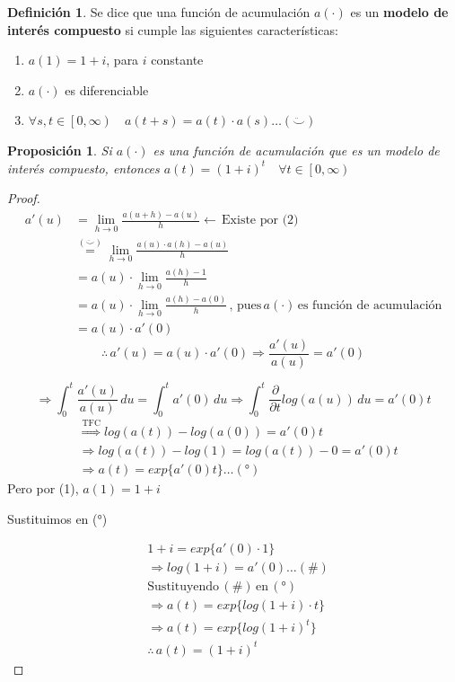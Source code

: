 \documentclass[
]{book}
\newtheorem{proposition}{Proposición}[chapter]
\theoremstyle{definition}
\newtheorem{definition}{Definición}[chapter]
\theoremstyle{definition}
\theoremstyle{definition}
\theoremstyle{definition}
\theoremstyle{remark}
\begin{document}
\begin{definition}

Se dice que una función de acumulación \(a(\cdot)\) es un \textbf{{modelo de interés compuesto}} si cumple las siguientes características:

\begin{enumerate}
\def\labelenumi{(\arabic{enumi})}
\item
  \(a(1) = 1+i\), para \(i\) constante
\item
  \(a(\cdot)\) es diferenciable
\item
  \(\forall s,t \in \left[0,\infty \right) \quad a(t+s)= a(t)\cdot a(s) \ldots (\ddot\smile)\)
\end{enumerate}

\end{definition}

\begin{proposition}
Si \(a(\cdot)\) es una función de acumulación que es un modelo de interés compuesto, entonces \(a(t) = (1+i)^t \quad \forall t\in \left[0,\infty \right)\)
\end{proposition}

\begin{proof}
\begin{align*}
a'(u) &= \lim\limits_{h \to 0} \frac{a(u+h)-a(u)}{h} \longleftarrow \, \text{Existe por (2)} \\
&\stackrel{(\ddot\smile)}{=} \lim\limits_{h \to 0} \frac{a(u)\cdot a(h) - a(u)}{h}\\
&=  a(u) \cdot \lim\limits_{h \to 0} \frac{a(h)-1}{h}\\
&=  a(u) \cdot \lim\limits_{h \to 0} \frac{a(h)-a(0)}{h}\, \text{, pues} \, a(\cdot) \, \text{es función de acumulación}\\
&= a(u)\cdot a'(0)
\end{align*}
\[\therefore \, a'(u) = a(u) \cdot a'(0) \Longrightarrow \frac{a'(u)}{a(u)} = a'(0)\]

\[\Longrightarrow \int_{0}^{t}\frac{a'(u)}{a(u)}\, du = \int_{0}^{t} a'(0)\, du \Longrightarrow \int_{0}^{t} \frac{\partial}{\partial t} log(a(u)) \, du = a'(0)t\]
\begin{align*}
&\stackrel{\text{TFC}}{\Longrightarrow} log(a(t)) - log(a(0)) = a'(0)t\\
&\Longrightarrow log(a(t)) - log(1) = log(a(t)) - 0 = a'(0)t\\
&\Longrightarrow a(t) = exp\{a'(0)t\} \ldots (°)
\end{align*}
Pero por (1), \(a(1) = 1+i\)

Sustituimos en (°)

\begin{align*}
&1+i = exp\{a'(0)\cdot 1\} \\
&\Longrightarrow log(1+i) = a'(0) \ldots (\#)\\
&\text{Sustituyendo}\,(\#)\, \text{en} \, (°)\\
& \Longrightarrow a(t) = exp\{log(1+i)\cdot t\}\\
& \Longrightarrow a(t) = exp\{log(1+i)^t\}\\
& \therefore \, a(t) = (1+i)^t
\end{align*}
\end{proof}
\end{document}
